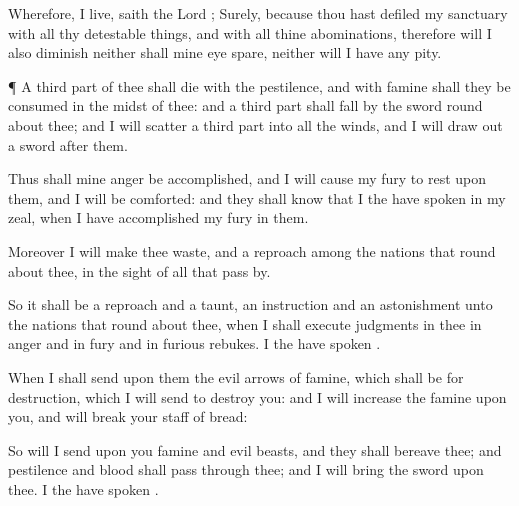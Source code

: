 {Wherefore,
{} I
live,
saith the
Lord
{}; Surely, because thou hast
defiled my
sanctuary with all thy detestable
things, and with all thine
abominations, therefore will I also
diminish
{} neither shall mine
eye
spare, neither will I have any
pity.


\par }{\PP {}¶ A third
part of thee shall
die with the
pestilence, and with
famine shall they be
consumed in the
midst of thee: and a third
part shall
fall by the
sword round
about thee; and I will
scatter a third
part into all the
winds, and I will draw
out a
sword
after them.

Thus shall mine
anger be
accomplished, and I will cause my
fury to
rest upon them, and I will be
comforted: and they shall
know that I the
{} have
spoken
{} in my
zeal, when I have
accomplished my
fury in them.

Moreover I will
make thee
waste, and a
reproach among the
nations that
{} round
about thee, in the
sight of all that pass
by.

So it shall be a
reproach and a
taunt, an
instruction and an
astonishment unto the
nations that
{} round
about thee, when I shall
execute
judgments in thee in
anger and in
fury and in
furious
rebukes. I the
{} have
spoken
{}.

When I shall
send upon them the
evil
arrows of
famine, which shall be for
{}
destruction,
{} which I will
send to
destroy you: and I will
increase the
famine upon you, and will
break your
staff of
bread:

So will I
send upon you
famine and
evil
beasts, and they shall
bereave thee; and
pestilence and
blood shall pass
through thee; and I will
bring the
sword upon thee. I the
{} have
spoken
{}.




\par }
